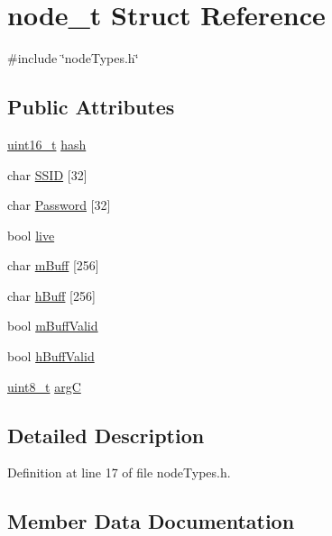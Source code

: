 \hypertarget{structnode__t}{}\section{node\+\_\+t Struct Reference}
\label{structnode__t}


{\ttfamily \#include \char`\"{}node\+Types.\+h\char`\"{}}

\subsection*{Public Attributes}
\begin{DoxyCompactItemize}
\item 
\hyperlink{stdint_8h_a273cf69d639a59973b6019625df33e30}{uint16\+\_\+t} \hyperlink{structnode__t_a207289d424c5717a4b11f513753bb94b}{hash}
\item 
char \hyperlink{structnode__t_a73b1098ca6535de652cd2d0c1e1be944}{S\+S\+ID} \mbox{[}32\mbox{]}
\item 
char \hyperlink{structnode__t_a02df80f8b236ada854aa6040a7267cde}{Password} \mbox{[}32\mbox{]}
\item 
bool \hyperlink{structnode__t_a41f66bb03ed3b89dd36173da30ee576a}{live}
\item 
char \hyperlink{structnode__t_a40ce9b00734fbf0b05ef9da40cba7d8e}{m\+Buff} \mbox{[}256\mbox{]}
\item 
char \hyperlink{structnode__t_a998c2bd496c99f79b9398468d28bdeb3}{h\+Buff} \mbox{[}256\mbox{]}
\item 
bool \hyperlink{structnode__t_a74ee1033ab93be44465c51e70bb4f6bd}{m\+Buff\+Valid}
\item 
bool \hyperlink{structnode__t_a3dd3d6eb01fa69f4cdaf48c32b83e2f5}{h\+Buff\+Valid}
\item 
\hyperlink{stdint_8h_aba7bc1797add20fe3efdf37ced1182c5}{uint8\+\_\+t} \hyperlink{structnode__t_ad9aa1c49cb7b4c9cd757c633f00e7728}{argC}
\end{DoxyCompactItemize}


\subsection{Detailed Description}


Definition at line 17 of file node\+Types.\+h.



\subsection{Member Data Documentation}
\mbox{\label{structnode__t_ad9aa1c49cb7b4c9cd757c633f00e7728}} 
